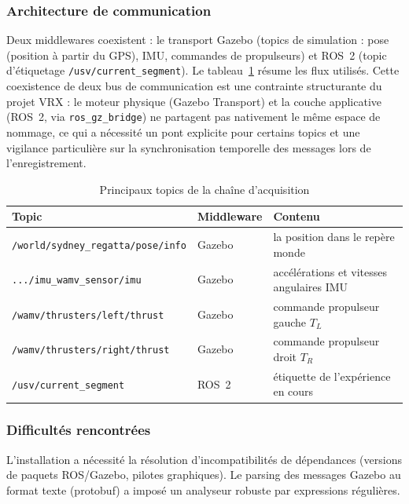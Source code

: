 \documentclass{rapportEILCO}
\begin{document}
	\subsubsection{Architecture de communication}
	Deux middlewares coexistent : le transport Gazebo (topics de simulation : pose (position à partir du GPS), IMU, commandes de propulseurs) et ROS~2 (topic d'étiquetage \verb|/usv/current_segment|). Le tableau~\ref{tab:topics} résume les flux utilisés. Cette coexistence de deux bus de communication est une contrainte structurante du projet VRX : le moteur physique (Gazebo Transport) et la couche applicative (ROS~2, via \texttt{ros\_gz\_bridge}) ne partagent pas nativement le même espace de nommage, ce qui a nécessité un pont explicite pour certains topics et une vigilance particulière sur la synchronisation temporelle des messages lors de l'enregistrement.
	
	\begin{table}[H]
		\centering
		\caption{Principaux topics de la chaîne d'acquisition}
		\label{tab:topics}
		\begin{tabular}{lll}
			\toprule
			\textbf{Topic} & \textbf{Middleware} & \textbf{Contenu} \\
			\midrule
			\verb|/world/sydney_regatta/pose/info| & Gazebo & la position dans le repère monde \\
			\verb|.../imu_wamv_sensor/imu| & Gazebo & accélérations et vitesses angulaires IMU \\
			\verb|/wamv/thrusters/left/thrust|  & Gazebo & commande propulseur gauche $T_L$ \\
			\verb|/wamv/thrusters/right/thrust| & Gazebo & commande propulseur droit $T_R$ \\
			\verb|/usv/current_segment| & ROS~2 & étiquette de l'expérience en cours \\
			\bottomrule
		\end{tabular}
	\end{table}
	
	\subsubsection{Difficultés rencontrées}
	L'installation a nécessité la résolution d'incompatibilités de dépendances (versions de paquets ROS/Gazebo, pilotes graphiques). Le parsing des messages Gazebo au format texte (protobuf) a imposé un analyseur robuste par expressions régulières.
	
\end{document}

